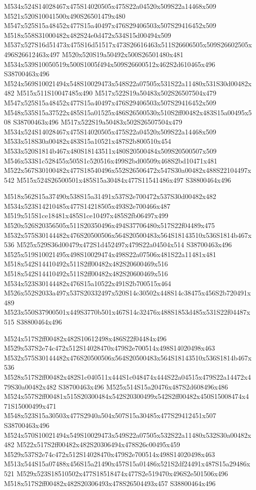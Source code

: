 \documentclass{article}
\begin{document}
\begin{multicols}{2}
M534x524S14028467x475S14020505x475S22a04520x509S22a14468x509 M521x520S10041500x490S26501479x480 M547x525S15a48452x477S15a40497x476S29406503x507S29416452x509 M518x558S31000482x482S24e0d472x534S15d00494x509 M537x527S16d51473x475S16d51517x473S26616463x511S26606505x509S26602505x496S26612463x497 M520x520S19a50492x500S26501480x481 M534x539S10050519x500S1005f494x509S26600512x462S2d610465x496 S38700463x496 M524x569S10021494x548S10029473x548S22a07505x531S22a11480x531S30d00482x482 M515x511S10047485x490 M517x522S19a50483x502S26507504x479 M547x525S15a48452x477S15a40497x476S29406503x507S29416452x509 M548x535S15a37522x485S15a01525x486S26500530x510S2ff00482x483S15a00495x508 S38700463x496 M517x522S19a50483x502S26507504x479 M534x524S14028467x475S14020505x475S22a04520x509S22a14468x509 M533x518S30a00482x483S15a10521x487S2b800510x454 M533x520S1814b467x480S18143511x480S20500484x509S20500507x509 M546x533S1c528455x505S1c520516x499S2bd00509x468S2bd10471x481 M522x567S30100482x477S18540496x552S26506472x547S30a00482x488S22104497x542 M515x524S26500501x485S15a30484x477S11541486x497 S38800464x496

M518x562S15a37490x538S15a31491x537S2e700472x537S30d00482x482 M534x523S14210485x477S14218505x493S2e700466x487 M519x515S1ce18481x485S1ce10497x485S2fb06497x499 M520x526S20356505x511S20350496x494S37706480x517S22f04489x475 M532x575S30144482x476S20500506x564S20500483x564S18143510x536S1814b467x536 M525x529S36d00479x472S1d452497x479S22a04504x514 S38700463x496 M525x519S10021495x498S10029474x498S22a07506x481S22a11481x481 M518x542S14410492x511S2ff00482x482S20600469x516 M518x542S14410492x511S2ff00482x482S20600469x516 M534x523S30144482x476S15a10522x491S2b700515x464 M526x552S2033a497x537S20332497x520S14c30502x448S14c38475x456S2b720491x489 M523x550S37900501x449S3770b501x467S14c32476x488S1853d485x531S22f04487x515 S38800464x496

M524x517S2ff00482x482S10612498x486S22f04484x496 M529x537S2e74c472x512S14028470x479S2e700514x498S14020498x463 M532x575S30144482x476S20500506x564S20500483x564S18143510x536S1814b467x536 M528x517S2ff00482x482S1c040511x444S1c048474x444S22a04515x479S22a14472x479S30a00482x482 S38700463x496 M525x514S15a20476x487S2d608496x486 M524x557S2ff00481x515S20300484x542S20300499x542S2ff00482x450S15008474x471S15000499x471 M548x523S15a30503x477S2940a504x507S15a30485x477S29412451x507 S38700463x496 M524x570S10021494x549S10029473x549S22a07505x532S22a11480x532S30a00482x482 M522x517S2ff00482x482S20306494x478S26c00495x459 M529x537S2e74c472x512S14028470x479S2e700514x498S14020498x463 M513x544S15a07488x456S15a21490x457S15a01486x521S2df24491x487S15a29486x521 M529x523S18510502x477S18518474x477S2e519470x496S2e501506x496 M518x517S2ff00482x482S20306493x478S26504493x457 S38800464x496


\end{multicols}
\end{document}
